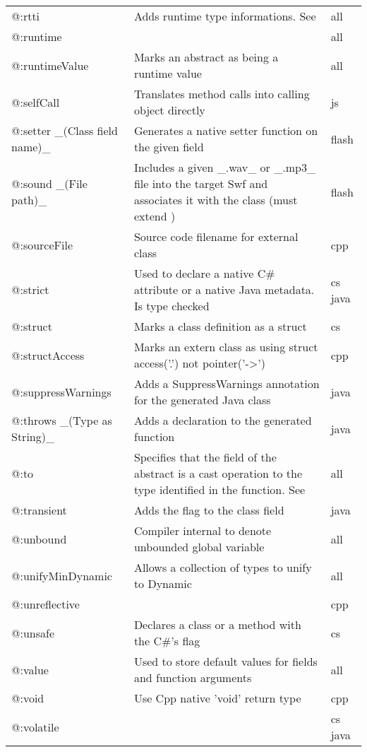 \begin{center}
\begin{tabular}{| l | l | l |}
	@:rtti   &  Adds runtime type informations. See \tref{RTTI}{cr-rtti}  &  all \\
	@:runtime  &    &  all \\
	@:runtimeValue  &  Marks an abstract as being a runtime value  &  all \\
	@:selfCall  &  Translates method calls into calling object directly  &  js \\
	@:setter \_(Class field name)\_  &  Generates a native setter function on the given field   &  flash \\
	@:sound \_(File path)\_  &  Includes a given \_.wav\_ or \_.mp3\_ file into the target Swf and associates it with the class (must extend \expr{flash.media.Sound})  &  flash \\
	@:sourceFile  &  Source code filename for external class  &  cpp \\
	@:strict  &  Used to declare a native C\# attribute or a native Java metadata. Is type checked  &  cs java \\
	@:struct  &  Marks a class definition as a struct   &  cs \\
	@:structAccess  &  Marks an extern class as using struct access('.') not pointer('->')  &  cpp \\
	@:suppressWarnings  &  Adds a SuppressWarnings annotation for the generated Java class  &  java \\
	@:throws \_(Type as String)\_  &  Adds a \expr{throws} declaration to the generated function   &  java \\
	@:to  &  Specifies that the field of the abstract is a cast operation to the type identified in the function. See \tref{Implicit Casts}{types-abstract-implicit-casts} & all \\
	@:transient  &  Adds the \expr{transient} flag to the class field  &  java \\
	@:unbound  &  Compiler internal to denote unbounded global variable  &  all \\
	@:unifyMinDynamic  &  Allows a collection of types to unify to Dynamic  &  all \\
	@:unreflective  &    &  cpp \\
	@:unsafe  &  Declares a class  or a method with the C\#'s \expr{unsafe} flag   &  cs \\
	@:value  &  Used to store default values for fields and function arguments  &  all \\
	@:void  &  Use Cpp native 'void' return type  &  cpp \\
	@:volatile  &    &  cs  java \\
\end{tabular}
\end{center}

